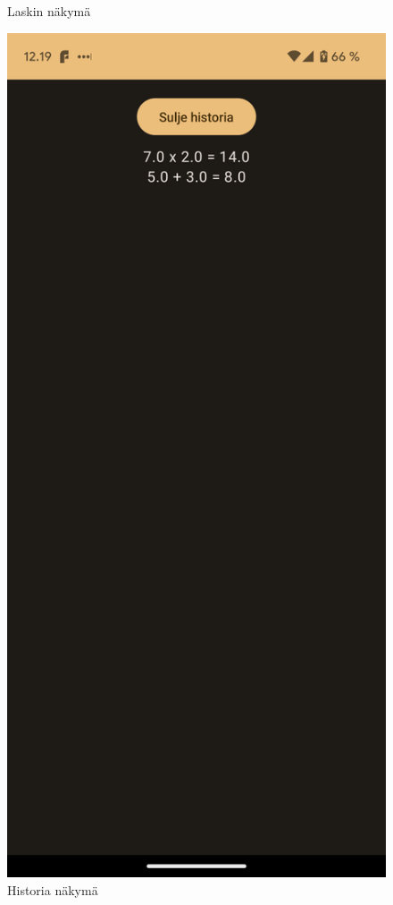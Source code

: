 \begin{figure}[h!]
\begin{minipage}[b]{.4\textwidth}
    \caption{Laskin näkymä}
    \label{fig:exercise-5-final-1}
\end{minipage}\qquad
\begin{minipage}[b]{.4\textwidth}
    \includegraphics[width=\textwidth]{figures/exercise-5-final-2.png}
    \caption{Historia näkymä}
    \label{fig:exercise-5-final-2}
\end{minipage}
\end{figure}

